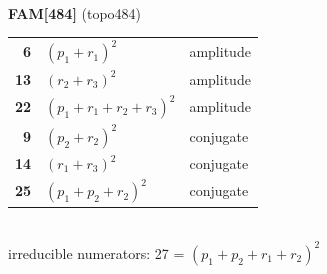 \documentclass[10pt]{article}
\begin{document}
\begin{minipage}[t]{0.48\textwidth}
{}\\[2mm]\textbf{FAM[484]} (topo484)\\[2pt]{\footnotesize\begin{tabular}{@{}r@{\ \ }l@{\ \ }l@{}}\textbf{6} & $(p_1+r_1)^2$ & amplitude\\
\textbf{13} & $(r_2+r_3)^2$ & amplitude\\
\textbf{22} & $(p_1+r_1+r_2+r_3)^2$ & amplitude\\
\textbf{9} & $(p_2+r_2)^2$ & conjugate\\
\textbf{14} & $(r_1+r_3)^2$ & conjugate\\
\textbf{25} & $(p_1+p_2+r_2)^2$ & conjugate\\\end{tabular}}\\[2pt]{\scriptsize irreducible numerators: 27 = $(p_1+p_2+r_1+r_2)^2$}\end{minipage}\hfill%
\end{document}
